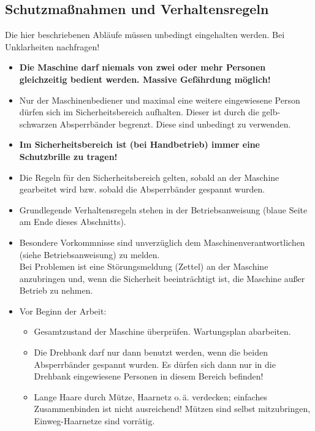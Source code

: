 \documentclass{\basedir/fablab-document}
\begin{document}
\subsection{Schutzmaßnahmen und Verhaltensregeln}
Die hier beschriebenen Abläufe müssen unbedingt eingehalten werden.
Bei Unklarheiten nachfragen!
\begin{itemize}
\item \textbf{Die Maschine darf niemals von zwei oder mehr Personen gleichzeitig bedient werden. Massive Gefährdung möglich!}
\item Nur der Maschinenbediener und maximal eine weitere eingewiesene Person dürfen sich im Sicherheitsbereich aufhalten. Dieser ist durch die gelb-schwarzen Absperrbänder begrenzt. Diese sind unbedingt zu verwenden.
\item \textbf{Im Sicherheitsbereich ist (bei Handbetrieb) immer eine Schutzbrille zu tragen!}
\item Die Regeln für den Sicherheitsbereich gelten, sobald an der Maschine gearbeitet wird bzw. sobald die Absperrbänder gespannt wurden.
\item Grundlegende Verhaltensregeln stehen in der Betriebsanweisung (blaue Seite am Ende dieses Abschnitts).
\item Besondere Vorkommnisse sind unverzüglich dem Maschinenverantwortlichen (siehe Betriebsanweisung) zu melden.\\
Bei Problemen ist eine Störungsmeldung (Zettel) an der Maschine anzubringen und, wenn die Sicherheit beeinträchtigt ist, die Maschine außer Betrieb zu nehmen.

\item Vor Beginn der Arbeit:
\begin{itemize}
\item Gesamtzustand der Maschine überprüfen. Wartungsplan abarbeiten.
\item Die Drehbank darf nur dann benutzt werden, wenn die beiden Absperrbänder gespannt wurden. Es dürfen sich dann nur in die Drehbank eingewiesene Personen in diesem Bereich befinden!
\item Lange Haare durch Mütze, Haarnetz o.\,ä. verdecken; einfaches Zusammenbinden ist nicht ausreichend! Mützen sind selbst mitzubringen, Einweg-Haarnetze sind vorrätig.
\end{itemize}


\end{itemize}
\end{document}
